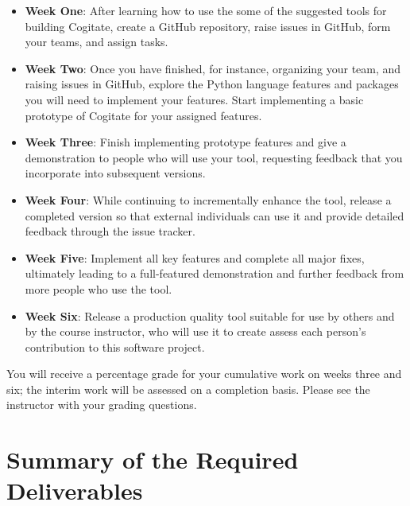 \documentclass[11pt]{article}
\begin{document}
\begin{itemize}

  \setlength{\itemsep}{0pt}

  \item {\bf Week One}: After learning how to use the some of the suggested
    tools for building Cogitate, create a GitHub repository, raise issues in
    GitHub, form your teams, and assign tasks.

  \item {\bf Week Two}: Once you have finished, for instance, organizing your
    team, and raising issues in GitHub, explore the Python language features and
    packages you will need to implement your features. Start implementing a
    basic prototype of Cogitate for your assigned features.

  \item {\bf Week Three}: Finish implementing prototype features and give a
    demonstration to people who will use your tool, requesting feedback that you
    incorporate into subsequent versions.

  \item {\bf Week Four}: While continuing to incrementally enhance the tool,
    release a completed version so that external individuals can use it and
    provide detailed feedback through the issue tracker.

  \item {\bf Week Five}: Implement all key features and complete all major
    fixes, ultimately leading to a full-featured demonstration and further
    feedback from more people who use the tool.

  \item {\bf Week Six}: Release a production quality tool suitable for use by
    others and by the course instructor, who will use it to create assess each
    person's contribution to this software project.

\end{itemize}

\vspace*{-.25em}

\noindent You will receive a percentage grade for your cumulative work on weeks
three and six; the interim work will be assessed on a completion basis. Please
see the instructor with your grading questions.

\section*{Summary of the Required Deliverables}
\end{document}
